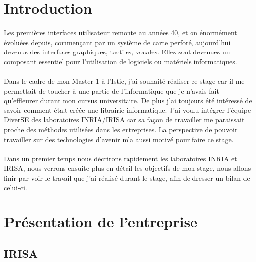\documentclass[11pt, a4paper, pdftex]{article}
\begin{document}
    \tableofcontents

    \newpage

    \section{Introduction}\label{sec:introduction}
        \paragraph{}
            Les premières interfaces utilisateur remonte au années 40, et on énormément évoluées depuis, commençant par un système de carte perforé, aujourd'hui devenus des interfaces graphiques, tactiles, vocales.
            Elles sont devenues un composant essentiel pour l'utilisation de logiciels ou matériels informatiques. %

        \paragraph{}
            Dans le cadre de mon Master 1 à l'Istic, j'ai souhaité réaliser ce stage car il me permettait de toucher à une partie de l'informatique que je n'avais
            fait qu'effleurer durant mon cursus universitaire.
            De plus j'ai toujours été intéressé de savoir comment était créée une librairie informatique.
            J'ai voulu intégrer l'équipe DiverSE des laboratoires INRIA/IRISA car sa façon de travailler me paraissait proche des méthodes utilisées dans les entreprises.
            La perspective de pouvoir travailler sur des technologies d'avenir m'a aussi motivé pour faire ce stage.

        \paragraph{}
            Dans un premier temps nous décrirons rapidement les laboratoires INRIA et IRISA, nous verrons ensuite plus en détail les objectifs de mon stage,
            nous allons finir par voir le travail que j'ai réalisé durant le stage, afin de dresser un bilan de celui-ci.
    \newpage
    \section{Présentation de l'entreprise}\label{sec:presentr}
    \vspace{1cm}
    \subsection{IRISA}\label{subsec:irisa}
\end{document}
